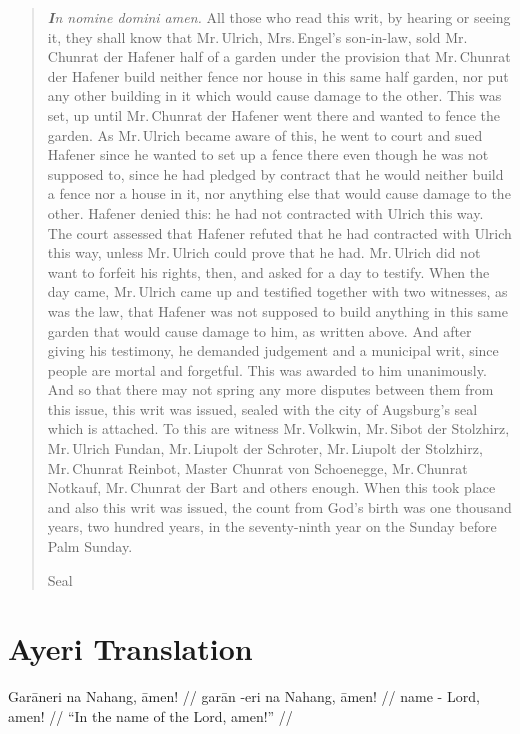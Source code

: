 \documentclass[12pt,paper=a4]{scrartcl}
\begin{document}
\blockquote{\emph{\textbf{I}n nomine domini amen.} All those who read this writ, 
by hearing or seeing it, they shall know that Mr.\,Ulrich, Mrs.\,Engel's 
son-in-law, sold Mr.\,Chunrat der Hafener half of a garden under the provision 
that Mr.\,Chunrat der Hafener build neither fence nor house in this same half 
garden, nor put any other building in it which would cause damage to the other. 
This was set, up until Mr.\,Chunrat der Hafener went there and wanted to fence the 
garden. As Mr.\,Ulrich became aware of this, he went to court and sued Hafener 
since he wanted to set up a fence there even though he was not supposed to, 
since he had pledged by contract that he would neither build a fence nor a house 
in it, nor anything else that would cause damage to the other. Hafener denied 
this: he had not contracted with Ulrich this way. The court assessed that 
Hafener refuted that he had contracted with Ulrich this way, unless Mr.\,Ulrich 
could prove that he had. Mr.\,Ulrich did not want to forfeit his rights, then, 
and asked for a day to testify. When the day came, Mr.\,Ulrich came up and 
testified together with two witnesses, as was the law, that Hafener was not 
supposed to build anything in this same garden that would cause damage to him, 
as written above. And after giving his testimony, he demanded judgement and a 
municipal writ, since people are mortal and forgetful. This was awarded to him 
unanimously. And so that there may not spring any more disputes between them 
from this issue, this writ was issued, sealed with the city of Augsburg's seal 
which is attached. To this are witness Mr.\,Volkwin, Mr.\,Sibot der Stolzhirz, 
Mr.\,Ulrich Fundan, Mr.\,Liupolt der Schroter, Mr.\,Liupolt der Stolzhirz, 
Mr.\,Chunrat Reinbot, Master Chunrat von Schoenegge, Mr.\,Chunrat Notkauf, 
Mr.\,Chunrat der Bart and others enough. When this took place and also this 
writ was issued, the count from God's birth was one thousand years, two hundred 
years, in the seventy-ninth year on the Sunday before Palm Sunday.

\begin{center}
Seal
\end{center}}

\section{Ayeri Translation}


\ex \begingl
	\glpreamble Garāneri na Nahang, āmen! //
	\gla garān -eri na Nahang, āmen! //
	\glb name -\Ins{} \Gen{} Lord, amen! //
	\glft \enquote{In the name of the Lord, amen!} //
\endgl \xe
\end{document}
